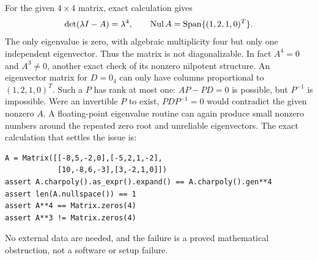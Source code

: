 For the given $4\times4$ matrix, exact calculation gives
\[\det(\lambda I-A)=\lambda^4,\qquad
\operatorname{Nul} A=\operatorname{Span}\{(1,2,1,0)^T\}.\]
The only eigenvalue is zero, with algebraic multiplicity four but
only one independent eigenvector. Thus the matrix is not diagonalizable.
In fact $A^4=0$ and $A^3\ne0$, another exact check of its nonzero
nilpotent structure.
An eigenvector matrix for $D=0_4$ can only have columns proportional
to $(1,2,1,0)^T$. Such a $P$ has rank at most one: $AP-PD=0$
is possible, but $P^{-1}$ is impossible. Were an invertible $P$
to exist, $PDP^{-1}=0$ would contradict the given nonzero $A$.
A floating-point eigenvalue routine can again produce small nonzero
numbers around the repeated zero root and unreliable eigenvectors.
The exact calculation that settles the issue is:
\begin{verbatim}
A = Matrix([[-8,5,-2,0],[-5,2,1,-2],
            [10,-8,6,-3],[3,-2,1,0]])
assert A.charpoly().as_expr().expand() == A.charpoly().gen**4
assert len(A.nullspace()) == 1
assert A**4 == Matrix.zeros(4)
assert A**3 != Matrix.zeros(4)
\end{verbatim}
No external data are needed, and the failure is a proved mathematical
obstruction, not a software or setup failure.
